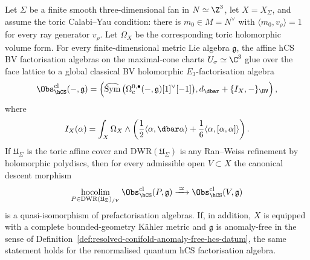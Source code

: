 \begin{theorem}
\label{thm:smooth-toric-cy3-hcs-factorization-descent}
Let \(\Sigma\) be a finite smooth three-dimensional fan in
\(N\simeq\Z^3\), let \(X=X_\Sigma\), and assume the toric
Calabi--Yau condition: there is \(m_0\in M=N^\vee\) with
\(\langle m_0,v_\rho\rangle=1\) for every ray generator
\(v_\rho\).  Let \(\Omega_X\) be the corresponding toric holomorphic
volume form.  For every finite-dimensional metric Lie algebra
\(\mathfrak g\), the affine hCS BV factorisation algebras on the
maximal-cone charts \(U_\sigma\simeq\C^3\) glue over the face lattice
to a global classical BV holomorphic \(E_3\)-factorisation algebra
\[
 \Obs_{\hCS}^{\mathrm{cl}}(-,\mathfrak g)
 =
 \left(
 \widehat{\mathrm{Sym}}\,
 \bigl(\Omega_c^{0,\bullet}(-,\mathfrak g)[1]^\vee[-1]\bigr),
 d_{\dbar}+\{I_X,-\}_{\BV}
 \right),
\]
where
\[
 I_X(\alpha)
 =
 \int_X\Omega_X\wedge
 \left(
 \frac12\langle\alpha,\dbar\alpha\rangle
 +\frac16\langle\alpha,[\alpha,\alpha]\rangle
 \right).
\]
If \(\mathfrak U_\Sigma\) is the toric affine cover and
\(\mathrm{DWR}(\mathfrak U_\Sigma)\) is any Ran--Weiss refinement by
holomorphic polydiscs, then for every admissible open \(V\subset X\)
the canonical descent morphism
\[
 \operatorname*{hocolim}_{P\in
 \mathrm{DWR}(\mathfrak U_\Sigma)_{/V}}
 \Obs_{\hCS}^{\mathrm{cl}}(P,\mathfrak g)
 \xrightarrow{\;\simeq\;}
 \Obs_{\hCS}^{\mathrm{cl}}(V,\mathfrak g)
\]
is a quasi-isomorphism of prefactorisation algebras.  If, in addition,
\(X\) is equipped with a complete bounded-geometry K\"ahler metric and
\(\mathfrak g\) is anomaly-free in the sense of
Definition~\ref{def:resolved-conifold-anomaly-free-hcs-datum}, the same
statement holds for the renormalised quantum hCS factorisation algebra.
\end{theorem}

